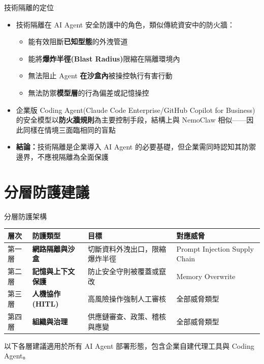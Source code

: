 \documentclass[aspectratio=1610]{Common/MyCourseBeamer}
\begin{document}
\begin{frame}[allowframebreaks=0.85]{技術隔離的定位}

	\begin{itemize}
		\item 技術隔離在 AI Agent 安全防護中的角色，類似傳統資安中的防火牆：
			\begin{itemize}
				\item 能有效阻斷\textbf{已知型態}的外洩管道
				\item 能將\textbf{爆炸半徑(Blast Radius)}限縮在隔離環境內
				\item 無法阻止 Agent \textbf{在沙盒內}被操控執行有害行動
				\item 無法防禦\textbf{模型層}的行為偏差或記憶操控
			\end{itemize}

		\item 企業版 Coding Agent(Claude Code Enterprise/GitHub Copilot for Business)的安全模型以\textbf{防火牆規則}為主要控制手段，結構上與 NemoClaw 相似——因此同樣在情境三面臨相同的盲點

		\item \textbf{結論：}技術隔離是企業導入 AI Agent 的\alert{必要基礎}，但企業需同時認知其防禦邊界，不應視隔離為全面保護
	\end{itemize}

\end{frame}


\section{分層防護建議}

\begin{frame}{分層防護架構}

	{\renewcommand{\arraystretch}{1.3}
	\begin{tabularx}{\linewidth}{p{1.2cm}p{2.0cm}Xp{3.5cm}}
		\toprule
		層次 & 防護類型 & 目標 & 對應威脅 \\
		\midrule
		第一層 & \textbf{網路隔離與沙盒} & 切斷資料外洩出口，限縮爆炸半徑 & Prompt Injection \newline Supply Chain \\
		\midrule
		第二層 & \textbf{記憶與上下文保護} & 防止安全守則被覆蓋或竄改 & Memory Overwrite \\
		\midrule
		第三層 & \textbf{人機協作(HITL)} & 高風險操作強制人工審核 & 全部威脅類型 \\
		\midrule
		第四層 & \textbf{組織與治理} & 供應鏈審查、政策、稽核與應變 & 全部威脅類型 \\
		\bottomrule
	\end{tabularx}
	}

	\vspace{0.3em}
	{\small 以下各層建議適用於所有 AI Agent 部署形態，包含企業自建代理工具與 Coding Agent。}

\end{frame}
\end{document}
